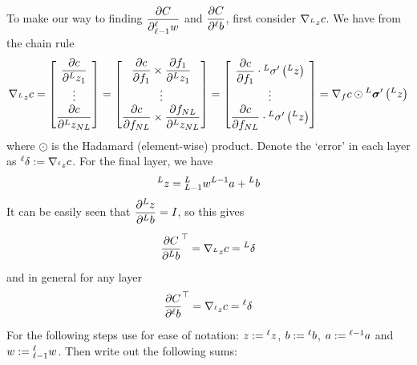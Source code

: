 \documentclass[11pt]{report} %
\begin{document}
To make our way to finding $\dfrac{\partial C}{\partial\mathstrut_{\ell-1}^{\ell}w}$ and $\dfrac{\partial C}{\partial\mathstrut^{\ell}b}$, first consider $\nabla_{\mathstrut^{L}z}c$. We have from the chain rule
\begin{equation}
\nabla_{\mathstrut^{L}z}c=\begin{bmatrix}\dfrac{\partial c}{\partial\mathstrut^{L}z_{1}}\\
\vdots\\
\dfrac{\partial c}{\partial\mathstrut^{L}z_{NL}}
\end{bmatrix}=\begin{bmatrix}\dfrac{\partial c}{\partial f_{1}}\times\dfrac{\partial f_{1}}{\partial\mathstrut^{L}z_{1}}\\
\vdots\\
\dfrac{\partial c}{\partial f_{NL}}\times\dfrac{\partial f_{NL}}{\partial\mathstrut^{L}z_{NL}}
\end{bmatrix}=\begin{bmatrix}\dfrac{\partial c}{\partial f_{1}}\cdot\mathstrut^{L}\sigma'\left(\mathstrut^{L}z\right)\\
\vdots\\
\dfrac{\partial c}{\partial f_{NL}}\cdot\mathstrut^{L}\sigma'\left(\mathstrut^{L}z\right)
\end{bmatrix}=\nabla_{f}c\odot\mathstrut^{L}\boldsymbol{\sigma}'\left(\mathstrut^{L}z\right)
\end{equation}
where $\odot$ is the Hadamard (element-wise) product. Denote the `error' in each layer as $\mathstrut^{\ell}\delta:=\nabla_{\mathstrut^{\ell}z}c$. For the final layer, we have
\begin{equation}
\mathstrut^{L}z=\mathstrut_{L-1}^{L}w\mathstrut^{L-1}a+\mathstrut^{L}b
\end{equation}
It can be easily seen that $\dfrac{\partial\mathstrut^{L}z}{\partial\mathstrut^{L}b}=I$, so this gives
\begin{equation}
\dfrac{\partial C}{\partial\mathstrut^{L}b}^{\top}=\nabla_{\mathstrut^{L}z}c=\mathstrut^{L}\delta
\end{equation}
and in general for any layer
\begin{equation}
\dfrac{\partial C}{\partial\mathstrut^{\ell}b}^{\top}=\nabla_{\mathstrut^{\ell}z}c=\mathstrut^{\ell}\delta
\end{equation}
For the following steps use for ease of notation: $z:=\mathstrut^{\ell}z$, $b:=\mathstrut^{\ell}b$,  $a:=\mathstrut^{\ell-1}a$ and $w:=\mathstrut_{\ell-1}^{\ell}w$. Then write out the following sums:
\end{document}
